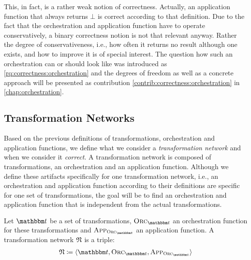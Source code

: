 This, in fact, is a rather weak notion of correctness. 
Actually, an application function that always returns $\bot$ is correct according to that definition.
Due to the fact that the orchestration and application function have to operate conservatively, a binary correctness notion is not that relevant anyway.
Rather the degree of conservativeness, i.e., how often it returns no result although one exists, and how to improve it is of special interest.
The question how such an orchestration can or should look like was introduced as \autoref{rq:correctness:orchestration} and the degrees of freedom as well as a concrete approach will be presented as contribution \autoref{contrib:correctness:orchestration} in \autoref{chap:orchestration}.


\subsection{Transformation Networks}

Based on the previous definitions of transformations, orchestration and application functions, we define what we consider a \emph{transformation network} and when we consider it \emph{correct}.
A transformation network is composed of transformations, an orchestration and an application function.
Although we define these artifacts specifically for one transformation network, i.e., an orchestration and application function according to their definitions are specific for one set of transformations, the goal will be to find an orchestration and application function that is independent from the actual transformations.

\begin{definition}
    \label{def:transformationnetwork}
    Let $\transformationset{T}$ be a set of transformations, $\orcfunction{\transformationset{T}}$ an orchestration function for these transformations and $\appfunction{\orcfunction{\transformationset{T}}}$ an application function.
    A transformation network $\transformationnetwork{N}$ is a triple:
    \begin{align*}
        \transformationnetwork{N} \equalsperdefinition \tupled{\transformationset{T}, \orcfunction{\transformationset{T}}, \appfunction{\orcfunction{\transformationset{T}}}}
    \end{align*}
\end{definition}

